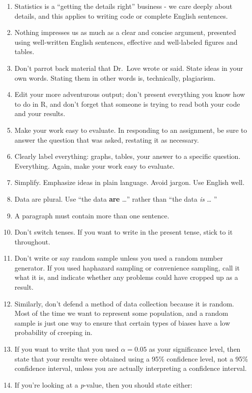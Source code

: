 \documentclass[
]{book}
\begin{document}
\begin{enumerate}
\def\labelenumi{\arabic{enumi}.}
\item
  Statistics is a ``getting the details right'' business - we care deeply about details, and this applies to writing code or complete English sentences.
\item
  Nothing impresses us as much as a clear and concise argument, presented using well-written English sentences, effective and well-labeled figures and tables.
\item
  Don't parrot back material that Dr.~Love wrote or said. State ideas in your own words. Stating them in other words is, technically, plagiarism.
\item
  Edit your more adventurous output; don't present everything you know how to do in R, and don't forget that someone is trying to read both your code and your results.
\item
  Make your work easy to evaluate. In responding to an assignment, be sure to answer the question that was asked, restating it as necessary.
\item
  Clearly label everything: graphs, tables, your answer to a specific question. Everything. Again, make your work easy to evaluate.
\item
  Simplify. Emphasize ideas in plain language. Avoid jargon. Use English well.
\item
  Data are plural. Use ``the data \textbf{are} \ldots{}'' rather than ``the data \emph{is} \ldots{} ''
\item
  A paragraph must contain more than one sentence.
\item
  Don't switch tenses. If you want to write in the present tense, stick to it throughout.
\item
  Don't write or say random sample unless you used a random number generator. If you used haphazard sampling or convenience sampling, call it what it is, and indicate whether any problems could have cropped up as a result.
\item
  Similarly, don't defend a method of data collection because it is random. Most of the time we want to represent some population, and a random sample is just one way to ensure that certain types of biases have a low probability of creeping in.
\item
  If you want to write that you used \(\alpha = 0.05\) as your significance level, then state that your results were obtained using a 95\% confidence level, not a 95\% confidence interval, unless you are actually interpreting a confidence interval.
\item
  If you're looking at a \emph{p}-value, then you should state either:


\end{enumerate}
\end{document}
